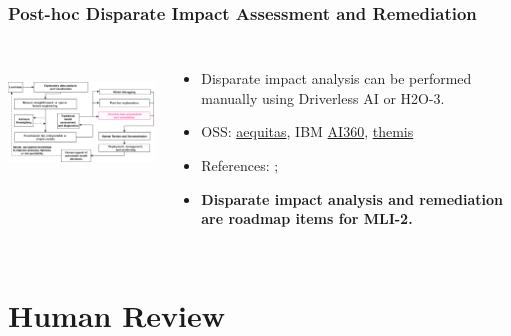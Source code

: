 \documentclass[11pt,
               aspectratio=169,
               hyperref={colorlinks}
               ]{beamer}
\begin{document}
			\begin{frame}		
		
			\frametitle{Post-hoc Disparate Impact Assessment and Remediation}		
			
			\begin{columns}
	
				\centering
				\includegraphics[height=100pt]{img/fair.png}
				
				\vspace{-5pt}
				\begin{itemize}
					\item Disparate impact analysis can be performed manually using Driverless AI or H2O-3.
					\item OSS: \href{https://github.com/dssg/aequitas}{aequitas}, IBM \href{https://github.com/IBM/AIF360}{AI360}, \href{https://github.com/LASER-UMASS/Themis}{themis}
					\item References: ;  
					\item \textbf{Disparate impact analysis and remediation are roadmap items for MLI-2.}
				\end{itemize}
				
			\end{columns}
		
		\end{frame}



	\section{Human Review}
\end{document}
